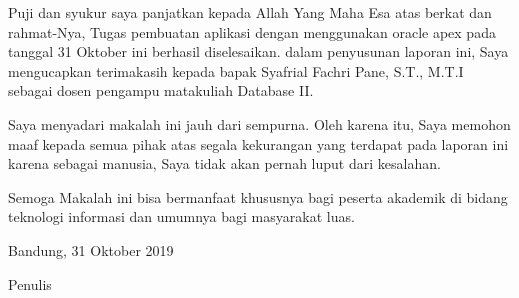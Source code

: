 \begin{acknowledgements}
Puji dan syukur saya panjatkan kepada Allah Yang Maha Esa atas berkat dan rahmat-Nya, Tugas pembuatan aplikasi dengan menggunakan oracle apex pada tanggal 31 Oktober ini berhasil diselesaikan. dalam penyusunan laporan ini, Saya mengucapkan terimakasih kepada bapak Syafrial Fachri Pane, S.T., M.T.I sebagai dosen pengampu matakuliah Database II.

Saya menyadari makalah ini jauh dari sempurna. Oleh karena itu, Saya memohon maaf kepada semua pihak atas segala kekurangan yang terdapat pada laporan ini karena sebagai manusia, Saya tidak akan pernah luput dari kesalahan. 

Semoga Makalah ini bisa bermanfaat khususnya bagi peserta akademik di bidang teknologi informasi dan umumnya bagi masyarakat luas. 

\begin{raggedleft}

Bandung, 31 Oktober 2019

Penulis

\end{raggedleft}

\end{acknowledgements}